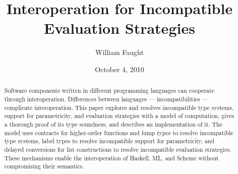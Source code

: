 \documentclass[12pt]{article}
\begin{document}
\title{Interoperation for Incompatible Evaluation Strategies}
\author{William Faught}
\date{October 4, 2010}
\maketitle

\begin{abstract}
Software components written in different programming languages can cooperate through interoperation.  Differences between languages --- incompatibilities --- complicate interoperation.  This paper explores and resolves incompatible type systems, support for parametricity, and evaluation strategies with a model of computation, gives a thorough proof of its type soundness, and describes an implementation of it.  The model uses contracts for higher-order functions and lump types to resolve incompatible type systems, label types to resolve incompatible support for parametricity, and delayed conversions for list constructions to resolve incompatible evaluation strategies.  These mechanisms enable the interoperation of Haskell, ML, and Scheme without compromising their semantics.
\end{abstract}






\clearpage

\nocite{*}


\end{document}
